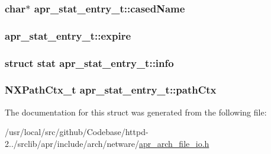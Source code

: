 \subsubsection[{\texorpdfstring{cased\+Name}{casedName}}]{\setlength{\rightskip}{0pt plus 5cm}char$\ast$ apr\+\_\+stat\+\_\+entry\+\_\+t\+::cased\+Name}\hypertarget{structapr__stat__entry__t_a7b317c0cbf1cda51d11bd7d75cc3f7d9}{}\label{structapr__stat__entry__t_a7b317c0cbf1cda51d11bd7d75cc3f7d9}
\subsubsection[{\texorpdfstring{expire}{expire}}]{ apr\+\_\+stat\+\_\+entry\+\_\+t\+::expire}\hypertarget{structapr__stat__entry__t_a8d69f4898156e3ff0e79b61ea7370277}{}\label{structapr__stat__entry__t_a8d69f4898156e3ff0e79b61ea7370277}
\subsubsection[{\texorpdfstring{info}{info}}]{\setlength{\rightskip}{0pt plus 5cm}struct stat apr\+\_\+stat\+\_\+entry\+\_\+t\+::info}\hypertarget{structapr__stat__entry__t_aee1501fc3891a4e65d4c8b6130bb928a}{}\label{structapr__stat__entry__t_aee1501fc3891a4e65d4c8b6130bb928a}
\subsubsection[{\texorpdfstring{path\+Ctx}{pathCtx}}]{\setlength{\rightskip}{0pt plus 5cm}N\+X\+Path\+Ctx\+\_\+t apr\+\_\+stat\+\_\+entry\+\_\+t\+::path\+Ctx}\hypertarget{structapr__stat__entry__t_aa494f612975d922420ef7a7eead13e57}{}\label{structapr__stat__entry__t_aa494f612975d922420ef7a7eead13e57}


The documentation for this struct was generated from the following file\+:\begin{DoxyCompactItemize}
\item 
/usr/local/src/github/\+Codebase/httpd-\/2../srclib/apr/include/arch/netware/\hyperlink{netware_2apr__arch__file__io_8h}{apr\+\_\+arch\+\_\+file\+\_\+io.\+h}\end{DoxyCompactItemize}

